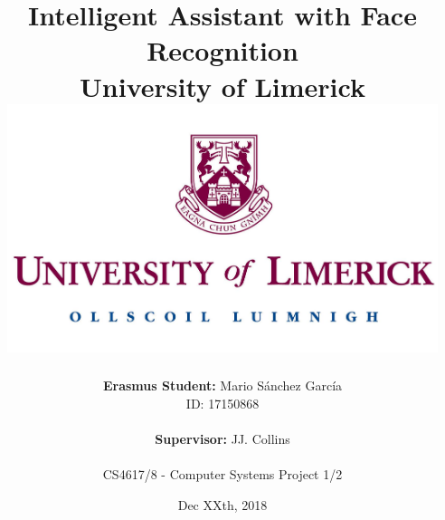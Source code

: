 \documentclass[a4paper,12pt,fleqn]{report}
\title{
	{Intelligent Assistant with Face Recognition}\\
	{\large University of Limerick}\\
	{\includegraphics[max width=126mm]{university.jpg}}
	\vspace{0.8cm}
}
\author{
	\textbf{Erasmus Student:} Mario Sánchez García\\
	ID: 17150868\\
	\\
	\textbf{Supervisor:} JJ. Collins\\
	\\
	CS4617/8 - Computer Systems Project 1/2
}
\date{Dec XXth, 2018}
\def \chapterspath {./chapters}
\begin{document}
\maketitle
\vfill



%
%
\tableofcontents

%
%

%
%





%

%

  
\end{document}
